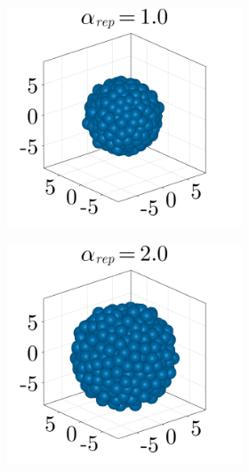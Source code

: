 \begin{figure}[ht]
    \centering
    \begin{subfigure}{\textwidth}
        \centering
        \begin{subfigure}{0.22\textwidth}
            \centering
            \includegraphics[width=\textwidth]{figures/303/303-aggregates-reps-1.png}
        \end{subfigure}
        \hfill
        \begin{subfigure}{0.22\textwidth}
            \centering
            \includegraphics[width=\textwidth]{figures/303/303-aggregates-reps-2.png}

\end{subfigure}
\end{subfigure}
\end{figure}
